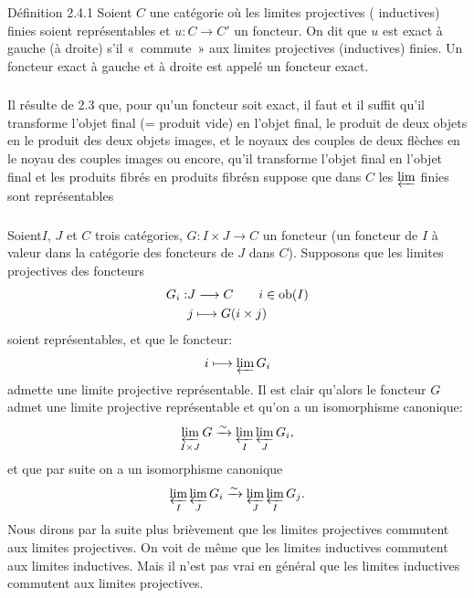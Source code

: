 \documentclass[10pt]{../fichiers-configuration-latex/smfart}
\begin{document}
\begin{enonce*}{Définition 2.4.1}
Soient $C$ une catégorie où les limites projectives (\resp
inductives) finies soient représentables et $u:C\rightarrow C'$ un
foncteur. On dit que $u$ est exact à gauche (\resp  à droite) s'il
« commute » aux limites projectives (\resp  inductives) finies.
Un foncteur exact à gauche et à droite est appelé un foncteur exact.
\end{enonce*}

\setcounter{subsection}{4} \setcounter{subsubsection}{1}
\subsubsection{}
Il résulte de 2.3 que, pour qu'un foncteur soit exact, il faut et il %
suffit qu'il transforme l'objet final (= produit vide) en l'objet
final, le produit de deux objets en le produit des deux objets
images, et le noyaux des couples de deux flèches en le noyau des
couples images ou encore, qu'il transforme l'objet final en l'objet
final et les produits fibrés en produits fibrésn
suppose que dans $C$ les $\varprojlim$ finies sont
représentables

\setcounter{subsection}{5} \setcounter{subsubsection}{-1}
\subsubsection{}
Soient\pageoriginale $I$, $J$ et $C$ trois catégories, $G:I\times
J\rightarrow C$ un foncteur (\ie un foncteur de $I$ à valeur dans la
catégorie des foncteurs de $J$ dans $C$). Supposons que les limites
projectives des foncteurs
\begin{align*}
G_i:&J\longrightarrow C\qquad i\in \operatorname{ob}(I)\\
    & j\longmapsto G(i\times j)
\end{align*}
soient représentables, et que le foncteur:
$$
i\longmapsto \varprojlim G_i
$$
admette une limite projective représentable. Il est clair qu'alors
le foncteur $G$ admet une limite projective représentable et qu'on a
un isomorphisme canonique:
$$
\varprojlim_{I\times J} G\\
\xrightarrow{\sim}\varprojlim_I \varprojlim_J G_i{},
$$
et que par suite on a un isomorphisme canonique
$$
\varprojlim_I \varprojlim_J G_i\xrightarrow{\sim}\varprojlim_J
\varprojlim_I G_j{}.
$$
Nous dirons par la suite plus brièvement que les limites projectives
commutent aux limites projectives. On voit de même que les limites
inductives commutent aux limites inductives. Mais il n'est pas vrai
en général que les limites inductives commutent aux limites
projectives.
\end{document}
